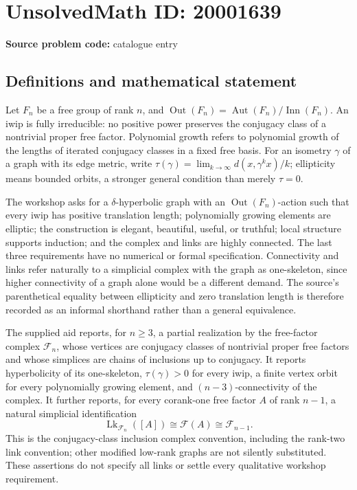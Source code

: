\documentclass[11pt]{article}
\begin{document}
\section*{UnsolvedMath ID: 20001639}
\textbf{Source problem code:} catalogue entry
\subsection{Definitions and mathematical statement}
Let \(F_n\) be a free group of rank \(n\), and \(\operatorname{Out}(F_n)=\operatorname{Aut}(F_n)/\operatorname{Inn}(F_n)\). An iwip is fully irreducible: no positive power preserves the conjugacy class of a nontrivial proper free factor. Polynomial growth refers to polynomial growth of the lengths of iterated conjugacy classes in a fixed free basis. For an isometry \(\gamma\) of a graph with its edge metric, write \(\tau(\gamma)=\lim_{k\to\infty}d(x,\gamma^kx)/k\); ellipticity means bounded orbits, a stronger general condition than merely \(\tau=0\).

The workshop asks for a \(\delta\)-hyperbolic graph with an \(\operatorname{Out}(F_n)\)-action such that every iwip has positive translation length; polynomially growing elements are elliptic; the construction is elegant, beautiful, useful, or truthful; local structure supports induction; and the complex and links are highly connected. The last three requirements have no numerical or formal specification. Connectivity and links refer naturally to a simplicial complex with the graph as one-skeleton, since higher connectivity of a graph alone would be a different demand. The source's parenthetical equality between ellipticity and zero translation length is therefore recorded as an informal shorthand rather than a general equivalence.

The supplied aid reports, for \(n\ge3\), a partial realization by the free-factor complex \(\mathcal F_n\), whose vertices are conjugacy classes of nontrivial proper free factors and whose simplices are chains of inclusions up to conjugacy. It reports hyperbolicity of its one-skeleton, \(\tau(\gamma)>0\) for every iwip, a finite vertex orbit for every polynomially growing element, and \((n-3)\)-connectivity of the complex. It further reports, for every corank-one free factor \(A\) of rank \(n-1\), a natural simplicial identification
\[
 \operatorname{Lk}_{\mathcal F_n}([A])\cong\mathcal F(A)\cong\mathcal F_{n-1}.
\]
This is the conjugacy-class inclusion complex convention, including the rank-two link convention; other modified low-rank graphs are not silently substituted. These assertions do not specify all links or settle every qualitative workshop requirement.
\end{document}
